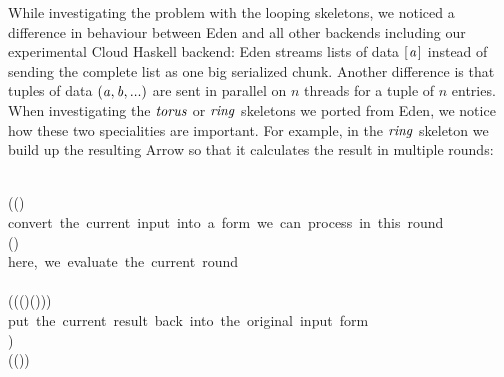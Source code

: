 \documentclass[paper=A4,twoside=true,openright,parskip=full,chapterprefix=true,headings=normal,bibliography=totoc,listof=totoc,titlepage=on,captions=tableabove,draft=false,british]{scrreprt}%
\begin{document}
\label{sec:CloudHaskellArrowParallelLimitsMitigation}

While investigating the problem with the looping skeletons, we noticed a
difference in behaviour between Eden and all other backends including
our experimental Cloud Haskell backend: Eden streams lists of data \ensuremath{[\mskip1.5mu \Varid{a}\mskip1.5mu]}
instead of sending the complete list as one big serialized chunk.
Another difference is that tuples of data \ensuremath{(\Varid{a},\Varid{b},\mathbin{...})} are sent in
parallel on \(n\) threads for a tuple of \(n\) entries. When
investigating the \ensuremath{\Varid{torus}} or \ensuremath{\Varid{ring}} skeletons we ported from Eden, we
notice how these two specialities are important. For example, in the
\ensuremath{\Varid{ring}} skeleton we build up the resulting Arrow so that it calculates
the result in multiple rounds:


\begin{hscode}\SaveRestoreHook
{}%
%
%
%
%
\>[B]{}\;\;\mathrel{=}{}\<[E]%
\\
\>[B]{}\<[5]%
\>[5]{}\;(\;(\mathbin{>\!\!>\!\!>})\mathbin{>\!\!>\!\!>}{}\<[E]%
\\
\>[5]{}\<[9]%
\>[9]{}\mbox{\onelinecomment  convert the current input into a form we can process in this round}{}\<[E]%
\\
\>[5]{}\<[9]%
\>[9]{}\;(\;)\mathbin{>\!\!>\!\!>}{}\<[E]%
\\
\>[5]{}\<[9]%
\>[9]{}\mbox{\onelinecomment  here, we evaluate the current round}{}\<[E]%
\\
\>[5]{}\<[9]%
\>[9]{}\;\;{}\<[E]%
\\
\>[9]{}\<[13]%
\>[13]{}(\;(\;(\;)\mathbin{>\!\!>\!\!>}\mathbin{>\!\!>\!\!>}\;(\;)))\mathbin{>\!\!>\!\!>}{}\<[E]%
\\
\>[5]{}\<[9]%
\>[9]{}\mbox{\onelinecomment  put the current result back into the original input form}{}\<[E]%
\\
\>[5]{}\<[9]%
\>[9]{}\;)\mathbin{>\!\!>\!\!>}{}\<[E]%
\\
\>[B]{}\<[5]%
\>[5]{}\;\;(\;(\;)){}\<[E]%
\ColumnHook
\end{hscode}\resethooks
\vspace{-2\baselineskip}
\end{document}
